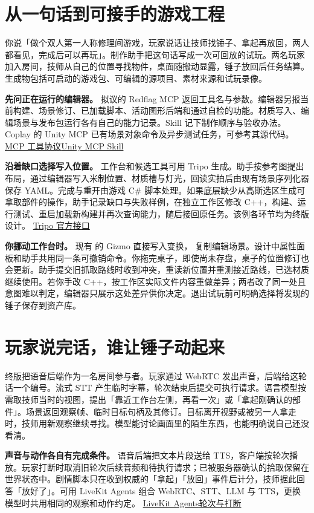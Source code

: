 \documentclass[UTF8,11pt,fontset=fandol,a4paper]{ctexart}
\newcommand{\f}[1]{\texttt{\detokenize{#1}}}\newcommand{\src}[2]{\href{#1}{#2}}\newcommand{\pg}[1]{\clearpage\section{#1}}
\begin{document}
\pg{从一句话到可接手的游戏工程}
你说「做个双人第一人称修理间游戏，玩家说话让技师找锤子、拿起再放回，两人都看见，完成后可以再玩」。制作助手把这句话写成一次可回放的试玩。两名玩家加入房间，技师从自己的位置寻找物件，桌面随搬动显露，锤子放回后任务结算。生成物包括可启动的游戏包、可编辑的源项目、素材来源和试玩录像。

\textbf{先问正在运行的编辑器。} 拟议的 Redflag MCP 返回工具名与参数。编辑器另报当前构建、场景修订、已加载脚本、活动图形后端和通过自检的功能。材质写入、编辑场景与发布包运行各有自己的能力记录。Skill 记下制作顺序与验收办法。Coplay 的 Unity MCP 已有场景对象命令及异步测试任务，可参考其源代码。 \src{https://modelcontextprotocol.io/specification/2025-11-25/server/tools}{MCP 工具协议}\quad\src{https://github.com/CoplayDev/unity-mcp/blob/19b66ecef4ac3a9be22a7a62ea21accb975c39e7/.claude/skills/unity-mcp-skill/SKILL.md}{Unity MCP Skill}

\textbf{沿着缺口选择写入位置。} 工作台和候选工具可用 Tripo 生成。助手按参考图提出布局，通过编辑器写入米制位置、材质槽与灯光，回读实拍后由现有场景序列化器保存 YAML。完成与重开由游戏 C\# 脚本处理。如果底层缺少从高斯选区生成可拿取部件的操作，助手记录缺口与失败样例，在独立工作区修改 C++，构建、运行测试、重启加载新构建并再次查询能力，随后接回原任务。该例各环节均为终版设计。 \src{https://developers.tripo3d.ai/en/mcp}{Tripo 官方接口}

\textbf{你挪动工作台时。} 现有 \f{ForgeLayer.cpp} 的 Gizmo 直接写入变换，\f{OnScenePlay} 复制编辑场景。设计中属性面板和助手共用同一条可撤销命令。你拖完桌子，即使尚未存盘，桌子的位置修订也会更新。助手提交旧抓取路线时收到冲突，重读新位置并重测接近路线，已选材质继续使用。若你手改 C++，按工作区实际文件内容重做差异；两者改了同一处且意图难以判定，编辑器只展示这处差异供你决定。退出试玩前可明确选择将发现的锤子保存到资产库。

\pg{玩家说完话，谁让锤子动起来}
终版把语音后端作为一名房间参与者。玩家通过 WebRTC 发出声音，后端给这轮话一个编号。流式 STT 产生临时字幕，轮次结束后提交可执行请求。语言模型按需取技师当时的视图，提出「靠近工作台左侧，再看一次」或「拿起刚确认的部件」。场景返回观察帧、临时目标句柄及其修订。目标离开视野或被另一人拿走时，技师用新观察继续寻找。模型能讨论画面里的陌生东西，也能明确说自己还没看清。

\textbf{声音与动作各自有完成条件。} 语音后端把文本片段送给 TTS，客户端按轮次播放。玩家打断时取消旧轮次后续音频和待执行请求；已被服务器确认的拾取保留在世界状态中。剧情脚本只在收到权威的「拿起」「放回」事件后计分，技师据此回答「放好了」。可用 LiveKit Agents 组合 WebRTC、STT、LLM 与 TTS，更换模型时共用相同的观察和动作约定。 \src{https://github.com/livekit/agents}{LiveKit Agents}\quad\src{https://docs.livekit.io/agents/logic/turns/}{轮次与打断}
\end{document}
